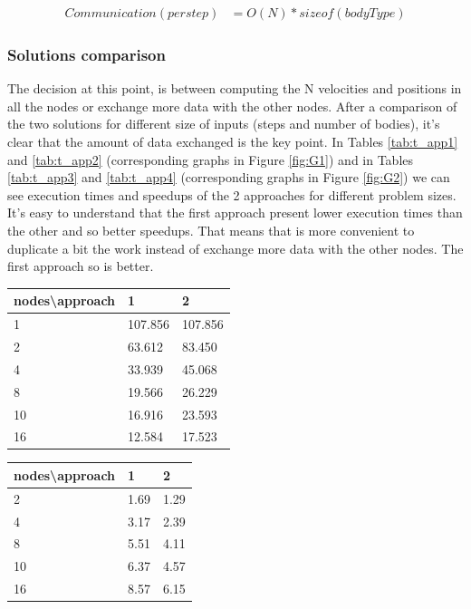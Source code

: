 \documentclass[a4paper]{article}
\begin{document}
\begin{equation} \label{eq:com_app2}
\begin{split}
Communication (per step) & = O(N)*sizeof(bodyType)
\end{split}
\end{equation}


\subsubsection{Solutions comparison}
\label{sec:sol_comp}
The decision at this point, is between computing the N velocities and positions in all the nodes or exchange more data with the other nodes. 
After a comparison of the two solutions for different size of inputs (steps and number of bodies), it's clear that the amount of data exchanged is the key point. In Tables \ref{tab:t_app1} and \ref{tab:t_app2} (corresponding graphs in Figure \ref{fig:G1}) and in Tables \ref{tab:t_app3} and \ref{tab:t_app4} (corresponding graphs in Figure \ref{fig:G2}) we can see execution times and speedups of the 2 approaches for different problem sizes. It's easy to understand that the first approach present lower execution times than the other and so better speedups. That means that is more convenient to duplicate a bit the work instead of exchange more data with the other nodes. The first approach so is better.
\\


\begin{minipage}[b]{.40\textwidth}
  \centering
  \begin{tabular}{l|l|l}
  \centering
nodes\textbackslash approach & 1 & 2 \\ \hline
1 & 107.856 & 107.856 \\ \hline
2 & 63.612 & 83.450 \\ \hline
4 & 33.939 & 45.068 \\ \hline
8 & 19.566 & 26.229 \\ \hline
10 & 16.916 & 23.593 \\ \hline
16 & 12.584 & 17.523 \\ 
    \hline
  \end{tabular}
  \label{tab:t_app1}
\end{minipage} \qquad
\begin{minipage}[b]{.40\textwidth}
  \centering
  \begin{tabular}{l|l|l}
nodes\textbackslash approach & 1 & 2 \\ \hline
2 & 1.69 & 1.29 \\ \hline
4 & 3.17 & 2.39 \\ \hline
8 & 5.51 & 4.11 \\ \hline
10 & 6.37 & 4.57 \\ \hline
16 & 8.57 & 6.15 \\ 
  \hline
  \end{tabular}
  \label{tab:t_app2}
\end{minipage}
\end{document}
